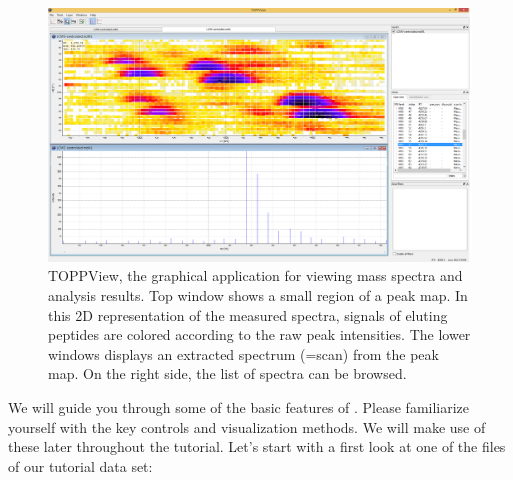 \begin{figure}
\includegraphics[width=\textwidth]{graphics/introduction/TOPPView.png}
\caption{TOPPView, the graphical application for viewing mass spectra and analysis results. Top window shows a small region of a peak map. In this 2D representation of the measured spectra, signals of eluting peptides are colored according to the raw peak intensities. The lower windows displays an extracted spectrum (=scan) from the peak map. On the right side, the list of spectra can be browsed.}
\label{fig:toppview}
\end{figure}

We will guide you through some of the basic features of . Please familiarize yourself with the key controls and visualization methods.
We will make use of these later throughout the tutorial. Let's start with a first look at one of the files of our tutorial data set:

